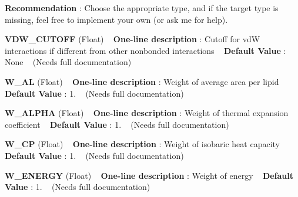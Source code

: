 \begin{DoxyItemize}
{\bfseries  Recommendation }\+: Choose the appropriate type, and if the target type is missing, feel free to implement your own (or ask me for help).\end{DoxyItemize}
\begin{DoxyItemize}
\item {\bfseries  V\+D\+W\+\_\+\+C\+U\+T\+O\+FF } (Float) ~\newline
{\bfseries  One-\/line description }\+: Cutoff for vdW interactions if different from other nonbonded interactions ~\newline
{\bfseries  Default Value }\+: None ~\newline
(Needs full documentation)\end{DoxyItemize}
\begin{DoxyItemize}
\item {\bfseries  W\+\_\+\+AL } (Float) ~\newline
{\bfseries  One-\/line description }\+: Weight of average area per lipid ~\newline
{\bfseries  Default Value }\+: 1. ~\newline
(Needs full documentation)\end{DoxyItemize}
\begin{DoxyItemize}
\item {\bfseries  W\+\_\+\+A\+L\+P\+HA } (Float) ~\newline
{\bfseries  One-\/line description }\+: Weight of thermal expansion coefficient ~\newline
{\bfseries  Default Value }\+: 1. ~\newline
(Needs full documentation)\end{DoxyItemize}
\begin{DoxyItemize}
\item {\bfseries  W\+\_\+\+CP } (Float) ~\newline
{\bfseries  One-\/line description }\+: Weight of isobaric heat capacity ~\newline
{\bfseries  Default Value }\+: 1. ~\newline
(Needs full documentation)\end{DoxyItemize}
\begin{DoxyItemize}
\item {\bfseries  W\+\_\+\+E\+N\+E\+R\+GY } (Float) ~\newline
{\bfseries  One-\/line description }\+: Weight of energy ~\newline
{\bfseries  Default Value }\+: 1. ~\newline
(Needs full documentation)\end{DoxyItemize}
